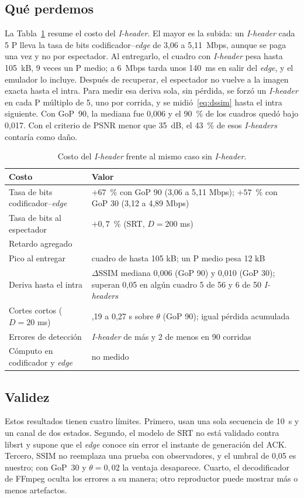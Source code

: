 \documentclass[10pt,twocolumn,letterpaper]{article}
\begin{document}
\subsection{Qué perdemos}
La Tabla~\ref{tab:costos} resume el costo del \emph{I-header}. El mayor es la subida: un \emph{I-header} cada 5 P lleva la tasa de bits codificador--\emph{edge} de 3,06 a 5,11~Mbps, aunque se paga una vez y no por espectador. Al entregarlo, el cuadro con \emph{I-header} pesa hasta 105~kB, 9 veces un P medio; a 6~Mbps tarda unos 140~ms en salir del \emph{edge}, y el emulador lo incluye. Después de recuperar, el espectador no vuelve a la imagen exacta hasta el intra. Para medir esa deriva sola, sin pérdida, se forzó un \emph{I-header} en cada P múltiplo de 5, uno por corrida, y se midió~\eqref{eq:dssim} hasta el intra siguiente. Con GoP~90, la mediana fue 0,006 y el 90~\% de los cuadros quedó bajo 0,017. Con el criterio de PSNR menor que 35~dB, el 43~\% de esos \emph{I-headers} contaría como daño.

\begin{table}[t]
\centering
\caption{Costo del \emph{I-header} frente al mismo caso sin \emph{I-header}.}
\label{tab:costos}
\footnotesize
\setlength{\tabcolsep}{4pt}
\begin{tabular}{@{}l>{\raggedright\arraybackslash}p{44mm}@{}}
\toprule
Costo & Valor \\
\midrule
Tasa de bits codificador--\emph{edge} & $+67$~\% con GoP 90 (3,06 a 5,11 Mbps); $+57$~\% con GoP 30 (3,12 a 4,89 Mbps) \\
Tasa de bits al espectador & $+0{,}7$~\% (SRT, $D=200$ ms) \\
Retardo agregado & 0 \\
Pico al entregar & cuadro de hasta 105 kB; un P medio pesa 12 kB \\
Deriva hasta el intra & $\Delta$SSIM mediana 0,006 (GoP 90) y 0,010 (GoP 30); superan 0,05 en algún cuadro 5 de 56 y 6 de 50 \emph{I-headers} \\
Cortes cortos ($D=20$ ms) & 0,19 a 0,27 s sobre $\theta$ (GoP 90); igual pérdida acumulada \\
Errores de detección & 1 \emph{I-header} de más y 2 de menos en 90 corridas \\
Cómputo en codificador y \emph{edge} & no medido \\
\bottomrule
\end{tabular}
\end{table}

\subsection{Validez}
Estos resultados tienen cuatro límites. Primero, usan una sola secuencia de 10~s y un canal de dos estados. Segundo, el modelo de SRT no está validado contra libsrt y supone que el \emph{edge} conoce sin error el instante de generación del ACK. Tercero, SSIM no reemplaza una prueba con observadores, y el umbral de 0,05 es nuestro; con GoP~30 y $\theta=0{,}02$ la ventaja desaparece. Cuarto, el decodificador de FFmpeg oculta los errores a su manera; otro reproductor puede mostrar más o menos artefactos.
\end{document}
